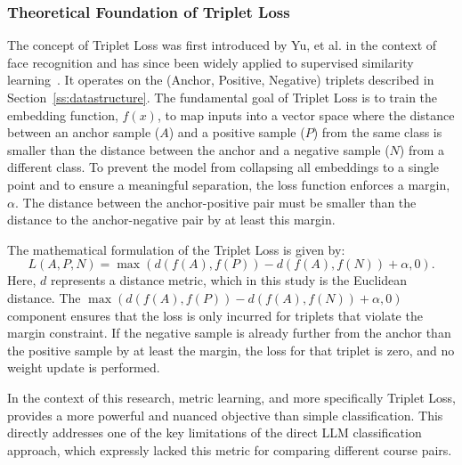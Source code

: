 \subsubsection{Theoretical Foundation of Triplet Loss}
The concept of Triplet Loss was first introduced by Yu, et al. in the context of face recognition and has since been widely applied to supervised similarity learning~\cite{Yu2020}. It operates on the (Anchor, Positive, Negative) triplets described in Section~\ref{ss:datastructure}. The fundamental goal of Triplet Loss is to train the embedding function, \(f(x)\), to map inputs into a vector space where the distance between an anchor sample (\(A\)) and a positive sample (\(P\)) from the same class is smaller than the distance between the anchor and a negative sample (\(N\)) from a different class. To prevent the model from collapsing all embeddings to a single point and to ensure a meaningful separation, the loss function enforces a margin, \(\alpha\). The distance between the anchor-positive pair must be smaller than the distance to the anchor-negative pair by at least this margin.

The mathematical formulation of the Triplet Loss is given by:
\[ L(A,P,N)=\max(d(f(A),f(P))-d(f(A),f(N))+\alpha,0). \]
Here, \(d\) represents a distance metric, which in this study is the Euclidean distance. The \(\max(d(f(A),f(P))-d(f(A),f(N))+\alpha,0)\) component ensures that the loss is only incurred for triplets that violate the margin constraint. If the negative sample is already further from the anchor than the positive sample by at least the margin, the loss for that triplet is zero, and no weight update is performed.

In the context of this research, metric learning, and more specifically Triplet Loss, provides a more powerful and nuanced objective than simple classification.  This directly addresses one of the key limitations of the direct LLM classification approach, which expressly lacked this metric for comparing different course pairs.

